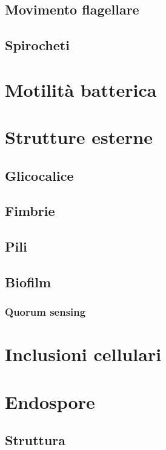 \subsection{Movimento flagellare}

\subsection{Spirocheti}

\section{Motilit\`a batterica}

\section{Strutture esterne}
\subsection{Glicocalice}

\subsection{Fimbrie}

\subsection{Pili}

\subsection{Biofilm}

\subsubsection{Quorum sensing}

\section{Inclusioni cellulari}

\section{Endospore}

\subsection{Struttura}

